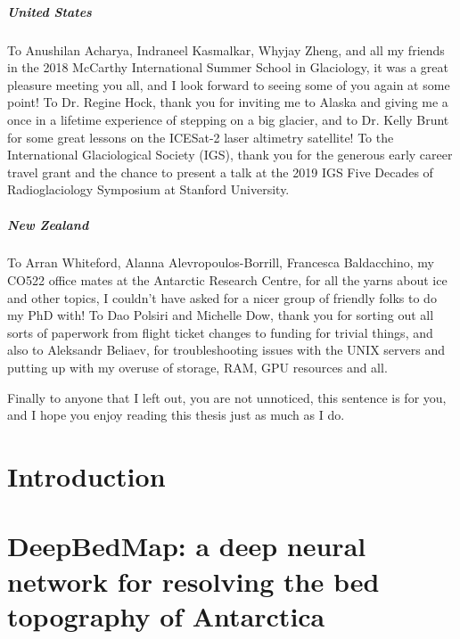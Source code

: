 \documentclass[12pt,twoside]{book}
\begin{document}
\begin{CJK*}{UTF8}{gbsn}
\paragraph{United States}

To Anushilan Acharya, Indraneel Kasmalkar, Whyjay Zheng, and all my friends in the 2018 McCarthy International Summer School in Glaciology, it was a great pleasure meeting you all, and I look forward to seeing some of you again at some point!
To Dr. Regine Hock, thank you for inviting me to Alaska and giving me a once in a lifetime experience of stepping on a big glacier, and to Dr. Kelly Brunt for some great lessons on the ICESat-2 laser altimetry satellite!
To the International Glaciological Society (IGS), thank you for the generous early career travel grant and the chance to present a talk at the 2019 IGS Five Decades of Radioglaciology Symposium at Stanford University.

\paragraph{New Zealand}

To Arran Whiteford, Alanna Alevropoulos-Borrill, Francesca Baldacchino, my CO522 office mates at the Antarctic Research Centre, for all the yarns about ice and other topics, I couldn't have asked for a nicer group of friendly folks to do my PhD with!
To Dao Polsiri and Michelle Dow, thank you for sorting out all sorts of paperwork from flight ticket changes to funding for trivial things, and also to Aleksandr Beliaev, for troubleshooting issues with the UNIX servers and putting up with my overuse of storage, RAM, GPU resources and all.

Finally to anyone that I left out, you are not unnoticed, this sentence is for you, and I hope you enjoy reading this thesis just as much as I do.

\end{CJK*}

\tableofcontents
\listoffigures
\listoftables

\glsaddall
{}
\printglossary[type=\acronymtype]

\chapter{Introduction}


\chapter{DeepBedMap: a deep neural network for resolving the bed topography of Antarctica}
\label{ch:2}

\end{document}
